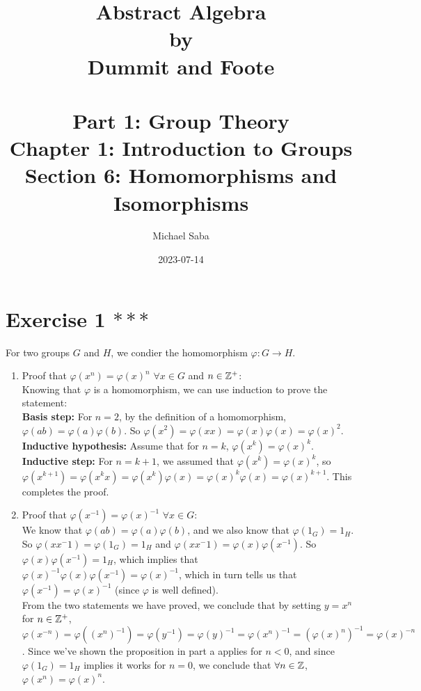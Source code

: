 \documentclass[12pt]{article}
\title{%
    \Huge Abstract Algebra \\
    \large by \\
    \Large Dummit and Foote \\~\\
    \huge Part 1: Group Theory \\
    \LARGE Chapter 1: Introduction to Groups \\
    \Large Section 6: Homomorphisms and Isomorphisms
}
\date{2023-07-14}
\author{Michael Saba}
\begin{document}
    \maketitle
    \newpage
    \setlength{\parindent}{0pt}


    \section*{Exercise 1 $***$}
    For two groups $G$ and $H$,
    we condier the homomorphism $\varphi: G \to H$. \\ 
    \begin{enumerate}[label=\textbf{\alph*.}]
        \item 
            Proof that $\varphi(x^n) = \varphi(x)^n$ $\forall x \in G$
            and $n \in \mathbb{Z}^+$: \\
            Knowing that $\varphi$ is a homomorphism,
            we can use induction to prove the statement: \\
            \textbf{Basis step:}
            For $n = 2$,
            by the definition of a homomorphism,
            $\varphi(ab) = \varphi(a)\varphi(b)$.
            So $\varphi(x^2) = \varphi(xx)
            = \varphi(x)\varphi(x)
            = \varphi(x)^2$. \\
            \textbf{Inductive hypothesis:}
            Assume that for $n = k$, $\varphi(x^k) = \varphi(x)^k$. \\ 
            \textbf{Inductive step:}
            For $n = k+1$,
            we assumed that $\varphi(x^k) = \varphi(x)^k$,
            so $\varphi(x^{k+1}) = \varphi(x^kx)
            = \varphi(x^k)\varphi(x)
            = \varphi(x)^k\varphi(x)
            = \varphi(x)^{k+1}$.
            This completes the proof.
        \item
            Proof that $\varphi(x^{-1}) = \varphi(x)^{-1}$
            $\forall x \in G$: \\
            We know that $\varphi(ab) = \varphi(a)\varphi(b)$,
            and we also know that $\varphi(1_G) = 1_H$.
            So $\varphi(xx^-1) = \varphi(1_G) = 1_H$
            and $\varphi(xx^-1) = \varphi(x)\varphi(x^{-1})$.
            So $\varphi(x)\varphi(x^{-1}) = 1_H$,
            which implies that
            $\varphi(x)^{-1}\varphi(x)\varphi(x^{-1}) = \varphi(x)^{-1}$,
            which in turn tells us that
            $\varphi(x^{-1}) = \varphi(x)^{-1}$
            (since $\varphi$ is well defined). \\
            From the two statements we have proved,
            we conclude that by setting $y = x^n$ for $n \in \mathbb{Z}^+$,
            $ \varphi(x^{-n}) = \varphi((x^n)^{-1})
            = \varphi(y^{-1})
            = \varphi(y)^{-1}
            = \varphi(x^n)^{-1}
            = (\varphi(x)^n)^{-1}
            = \varphi(x)^{-n}$.
            Since we've shown the proposition in part a applies for $n < 0$,
            and since $\varphi(1_G) = 1_H$ implies it works for
            $n = 0$, we conclude that $\forall n \in \mathbb{Z}$, 
            $\varphi(x^n) = \varphi(x)^n$.
    \end{enumerate}
\end{document}
